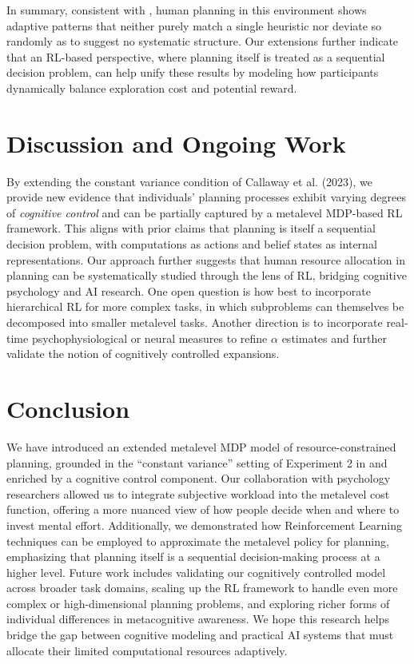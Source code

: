 \documentclass[a4paper,12pt,oneside,article]{memoir}
\begin{document}
In summary, consistent with \cite{Callaway2023rationaluse}, human planning in this environment shows adaptive patterns that neither purely match a single heuristic nor deviate so randomly as to suggest no systematic structure. Our extensions further indicate that an RL-based perspective, where planning itself is treated as a sequential decision problem, can help unify these results by modeling how participants dynamically balance exploration cost and potential reward.

\section*{Discussion and Ongoing Work}
By extending the constant variance condition of Callaway et al. (2023), we provide new evidence that individuals’ planning processes exhibit varying degrees of \emph{cognitive control} and can be partially captured by a metalevel MDP-based RL framework. This aligns with prior claims that planning is itself a sequential decision problem, with computations as actions and belief states as internal representations.  
Our approach further suggests that human resource allocation in planning can be systematically studied through the lens of RL, bridging cognitive psychology and AI research. One open question is how best to incorporate hierarchical RL for more complex tasks, in which subproblems can themselves be decomposed into smaller metalevel tasks. Another direction is to incorporate real-time psychophysiological or neural measures to refine $\alpha$ estimates and further validate the notion of cognitively controlled expansions.

\section*{Conclusion}
We have introduced an extended metalevel MDP model of resource-constrained planning, grounded in the “constant variance” setting of Experiment 2 in \cite{Callaway2023rationaluse} and enriched by a cognitive control component. Our collaboration with psychology researchers allowed us to integrate subjective workload into the metalevel cost function, offering a more nuanced view of how people decide when and where to invest mental effort. Additionally, we demonstrated how Reinforcement Learning techniques can be employed to approximate the metalevel policy for planning, emphasizing that planning itself is a sequential decision-making process at a higher level.  
Future work includes validating our cognitively controlled model across broader task domains, scaling up the RL framework to handle even more complex or high-dimensional planning problems, and exploring richer forms of individual differences in metacognitive awareness. We hope this research helps bridge the gap between cognitive modeling and practical AI systems that must allocate their limited computational resources adaptively.
\end{document}
